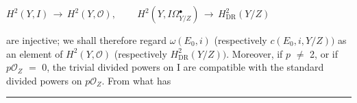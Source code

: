 \documentclass[9pt]{article}
\newcommand{\CanonText}[1]{\par{\fontsize{8.0}{9.35}\selectfont\RaggedRight #1\par}\vspace{2.2pt}}
\newcommand{\CanonDisplay}[1]{\par\vspace{1.2pt}\begin{center}{\fontsize{7.2}{8.4}\selectfont\(\displaystyle #1\)}\end{center}\vspace{1.2pt}}
\begin{document}
\begin{minipage}[t][\dimexpr\textheight-5pt\relax][t]{\textwidth}
\CanonDisplay{H^{2}(Y,I)\,\to{}\,H^{2}(Y,\mathcal{O}),\qquad\,H^{2}(Y,I\Omega{}^{\bullet{}}_{Y/Z})\,\to{}\,H^{2}_{\mathrm{DR}}(Y/Z)}
\CanonText{are injective; we shall therefore regard \(\omega{}(E_{0},i)\) (respectively \(c(E_{0},i,Y/Z))\) as an element of \(H^{2}(Y,\mathcal{O})\) (respectively \(H^{2}_{\mathrm{DR}}(Y/Z))\). Moreover, if \(p\) \(\neq{}\) 2, or if \(p\mathcal{O}_{Z}\) \(=\) 0, the trivial divided powers on I are compatible with the standard divided powers on \(p\mathcal{O}_{Z}\). From what has}
\vfill
{\color{Accent}\hrule height 0.35pt}\vspace{3pt}
\end{minipage}
\newpage
\end{document}

